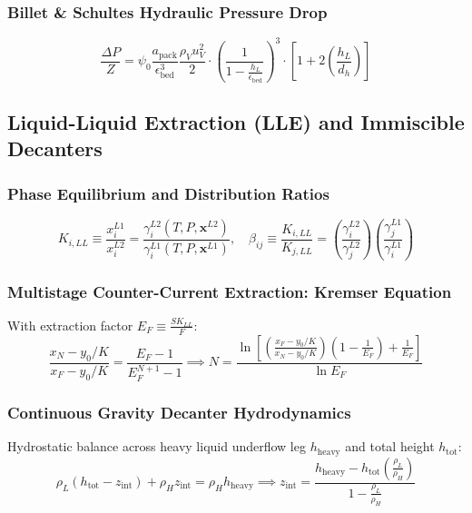 \documentclass[11pt,a4paper]{article}
\begin{document}
\subsubsection{Billet \& Schultes Hydraulic Pressure Drop}
\begin{equation}
\frac{\Delta P}{Z} = \psi_0 \frac{a_{\text{pack}}}{\epsilon_{\text{bed}}^3} \frac{\rho_V u_V^2}{2} \cdot \left( \frac{1}{1 - \frac{h_L}{\epsilon_{\text{bed}}}} \right)^3 \cdot \left[ 1 + 2 \left( \frac{h_L}{d_h} \right) \right]
\end{equation}

\subsection{Liquid-Liquid Extraction (LLE) and Immiscible Decanters}

\subsubsection{Phase Equilibrium and Distribution Ratios}
\begin{equation}
K_{i,LL} \equiv \frac{x_i^{L1}}{x_i^{L2}} = \frac{\gamma_i^{L2}(T, P, \mathbf{x}^{L2})}{\gamma_i^{L1}(T, P, \mathbf{x}^{L1})}, \quad \beta_{ij} \equiv \frac{K_{i,LL}}{K_{j,LL}} = \left( \frac{\gamma_i^{L2}}{\gamma_j^{L2}} \right) \left( \frac{\gamma_j^{L1}}{\gamma_i^{L1}} \right)
\end{equation}

\subsubsection{Multistage Counter-Current Extraction: Kremser Equation}
With extraction factor $E_F \equiv \frac{S K_{LL}}{F}$:
\begin{equation}
\frac{x_N - y_0 / K}{x_F - y_0 / K} = \frac{E_F - 1}{E_F^{N+1} - 1} \implies N = \frac{\ln\left[ \left( \frac{x_F - y_0 / K}{x_N - y_0 / K} \right) \left( 1 - \frac{1}{E_F} \right) + \frac{1}{E_F} \right]}{\ln E_F}
\end{equation}

\subsubsection{Continuous Gravity Decanter Hydrodynamics}
Hydrostatic balance across heavy liquid underflow leg $h_{\text{heavy}}$ and total height $h_{\text{tot}}$:
\begin{equation}
\rho_L (h_{\text{tot}} - z_{\text{int}}) + \rho_H z_{\text{int}} = \rho_H h_{\text{heavy}} \implies z_{\text{int}} = \frac{h_{\text{heavy}} - h_{\text{tot}} \left( \frac{\rho_L}{\rho_H} \right)}{1 - \frac{\rho_L}{\rho_H}}
\end{equation}
\end{document}
